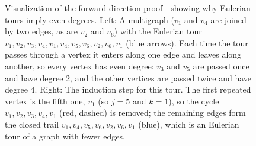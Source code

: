 \documentclass{article}
\theoremstyle{definition}
\begin{document}
\begin{figure}[ht]
\caption{Visualization of the forward direction proof - showing why Eulerian tours imply even degrees. Left: A multigraph ($v_1$ and $v_4$ are joined by two edges, as are $v_2$ and $v_6$) with the Eulerian tour $v_1, v_2, v_3, v_4, v_1, v_4, v_5, v_6, v_2, v_6, v_1$ (blue arrows). Each time the tour passes through a vertex it enters along one edge and leaves along another, so every vertex has even degree: $v_3$ and $v_5$ are passed once and have degree 2, and the other vertices are passed twice and have degree 4. Right: The induction step for this tour. The first repeated vertex is the fifth one, $v_1$ (so $j = 5$ and $k = 1$), so the cycle $v_1, v_2, v_3, v_4, v_1$ (red, dashed) is removed; the remaining edges form the closed trail $v_1, v_4, v_5, v_6, v_2, v_6, v_1$ (blue), which is an Eulerian tour of a graph with fewer edges.}
\label{fig:euler-forward-proof}
\end{figure}
\end{document}
